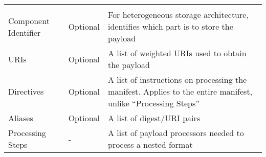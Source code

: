 \documentclass[0-thesis.tex]{subfiles}
\begin{document}
\begin{longtable}[]{@{}lll@{}}
\begin{minipage}[t]{0.60\columnwidth}
    \end{minipage}\tabularnewline
    \begin{minipage}[t]{0.23\columnwidth}\raggedright\strut
    Component Identifier\strut
    \end{minipage} & \begin{minipage}[t]{0.26\columnwidth}\raggedright\strut
    Optional\strut
    \end{minipage} & \begin{minipage}[t]{0.60\columnwidth}\raggedright\strut
    For heterogeneous storage architecture, identifies which part is to store the
    payload\strut
    \end{minipage}\tabularnewline
    \begin{minipage}[t]{0.23\columnwidth}\raggedright\strut
    URIs\strut
    \end{minipage} & \begin{minipage}[t]{0.26\columnwidth}\raggedright\strut
    Optional\strut
    \end{minipage} & \begin{minipage}[t]{0.60\columnwidth}\raggedright\strut
    A list of weighted URIs used to obtain the payload\strut
    \end{minipage}\tabularnewline
    \begin{minipage}[t]{0.23\columnwidth}\raggedright\strut
    Directives\strut
    \end{minipage} & \begin{minipage}[t]{0.26\columnwidth}\raggedright\strut
    Optional\strut
    \end{minipage} & \begin{minipage}[t]{0.60\columnwidth}\raggedright\strut
    A list of instructions on processing the manifest. Applies to the entire
    manifest, unlike ``Processing Steps''\strut
    \end{minipage}\tabularnewline
    \begin{minipage}[t]{0.23\columnwidth}\raggedright\strut
    Aliases\strut
    \end{minipage} & \begin{minipage}[t]{0.26\columnwidth}\raggedright\strut
    Optional\strut
    \end{minipage} & \begin{minipage}[t]{0.60\columnwidth}\raggedright\strut
    A list of digest/URI pairs\strut
    \end{minipage}\tabularnewline
    \begin{minipage}[t]{0.23\columnwidth}\raggedright\strut
    Processing Steps\strut
    \end{minipage} & \begin{minipage}[t]{0.26\columnwidth}\raggedright\strut
    -\strut
    \end{minipage} & \begin{minipage}[t]{0.60\columnwidth}\raggedright\strut
    A list of payload processors needed to process a nested format\strut
    \end{minipage}\tabularnewline
    \bottomrule
\end{longtable}
\end{document}
